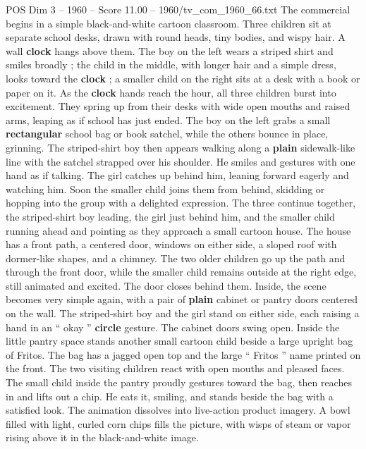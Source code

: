 \begin{textsample}{POS Dim 3 – 1960 – Score 11.00 – 1960/tv\_com\_1960\_66.txt}  \label{ex:f3_pos_029}
The commercial begins in a simple black-and-white cartoon classroom.
Three children sit at separate school desks, drawn with round heads, tiny bodies, and wispy hair.
A wall \textbf{clock} hangs above them.
The boy on the left wears a striped shirt and smiles broadly ; the child in the middle, with longer hair and a simple dress, looks toward the \textbf{clock} ; a smaller child on the right sits at a desk with a book or paper on it.
As the \textbf{clock} hands reach the hour, all three children burst into excitement.
They spring up from their desks with wide open mouths and raised arms, leaping as if school has just ended.
The boy on the left grabs a small \textbf{rectangular} school bag or book satchel, while the others bounce in place, grinning.
The striped-shirt boy then appears walking along a \textbf{plain} sidewalk-like line with the satchel strapped over his shoulder.
He smiles and gestures with one hand as if talking.
The girl catches up behind him, leaning forward eagerly and watching him.
Soon the smaller child joins them from behind, skidding or hopping into the group with a delighted expression.
The three continue together, the striped-shirt boy leading, the girl just behind him, and the smaller child running ahead and pointing as they approach a small cartoon house.
The house has a front path, a centered door, windows on either side, a sloped roof with dormer-like shapes, and a chimney.
The two older children go up the path and through the front door, while the smaller child remains outside at the right edge, still animated and excited.
The door closes behind them.
Inside, the scene becomes very simple again, with a pair of \textbf{plain} cabinet or pantry doors centered on the wall.
The striped-shirt boy and the girl stand on either side, each raising a hand in an “ okay ” \textbf{circle} gesture.
The cabinet doors swing open.
Inside the little pantry space stands another small cartoon child beside a large upright bag of Fritos.
The bag has a jagged open top and the large “ Fritos ” name printed on the front.
The two visiting children react with open mouths and pleased faces.
The small child inside the pantry proudly gestures toward the bag, then reaches in and lifts out a chip.
He eats it, smiling, and stands beside the bag with a satisfied look.
The animation dissolves into live-action product imagery.
A bowl filled with light, curled corn chips fills the picture, with wisps of steam or vapor rising above it in the black-and-white image.

\end{textsample}
